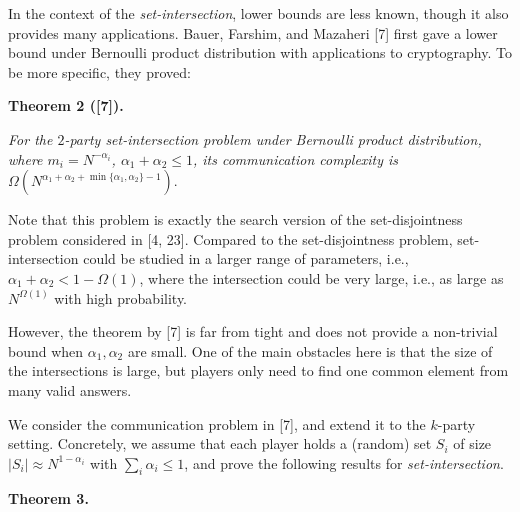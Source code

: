 \documentclass[10pt,a4paper]{article}
\begin{document}
In the context of the \emph{set-intersection}, lower bounds are less known, though it also provides many applications. Bauer, Farshim, and Mazaheri [7] first gave a lower bound under Bernoulli product distribution with applications to cryptography. To be more specific, they proved:\par





\par\medskip\noindent\textbf{
\textbf{Theorem 2}\textbf{ }([7])\textbf{.}
}\par



\emph{For the $2$-party set-intersection problem under Bernoulli product distribution, where $m_{i}=N^{-\alpha_{i}}$, $\alpha_{1}+\alpha_{2}\leq 1$, its communication complexity is $\Omega\left(N^{\alpha_{1}+\alpha_{2}+\min\{\alpha_{1},\alpha_{2}\}-1}\right).$}\par






Note that this problem is exactly the search version of the set-disjointness problem considered in [4, 23]. Compared to the set-disjointness problem, set-intersection could be studied in a larger range of parameters, i.e., $\alpha_{1}+\alpha_{2}<1-\Omega(1)$, where the intersection could be very large, i.e., as large as $N^{\Omega(1)}$ with high probability.\par




However, the theorem by [7] is far from tight and does not provide a non-trivial bound when $\alpha_{1},\alpha_{2}$ are small. One of the main obstacles here is that the size of the intersections is large, but players only need to find one common element from many valid answers.\par




We consider the communication problem in [7], and extend it to the $k$-party setting. Concretely, we assume that each player holds a (random) set $S_{i}$ of size $|S_{i}|\approx N^{1-\alpha_{i}}$ with $\sum_{i}\alpha_{i}\leq 1$, and prove the following results for \emph{set-intersection}.\par





\par\medskip\noindent\textbf{
\textbf{Theorem 3}\textbf{.}
}\par
\end{document}
